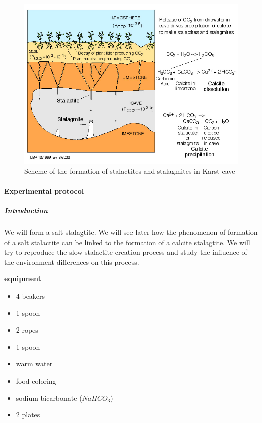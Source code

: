 \documentclass[draft, final]{report}
\begin{document}
\begin{figure}[!ht]
  \centering
  \includegraphics[scale=0.7]{LateX/Images/stalactitescheme.jpg}
  \caption{Scheme of the formation of stalactites and stalagmites in Karst cave\cite{stalactiteformationscheme}}
\end{figure}
\clearpage
  \paragraph{Experimental protocol}
  \subparagraph{Introduction}
  We will form a salt stalagtite. We will see later how the phenomenon of formation of a salt stalactite can be linked to the formation of a calcite stalagtite. We will try to reproduce the slow stalactite creation process and study the influence of the environment differences on this process.

\textbf{equipment}
\begin{itemize}
  \item 4 beakers
  \item 1 spoon
  \item 2 ropes
  \item 1 spoon
  \item warm water
  \item food coloring
  \item sodium bicarbonate ($NaHCO_{3}$)
  \item 2 plates
\end{itemize}
\end{document}
